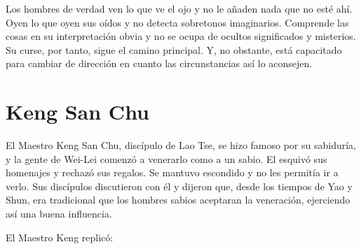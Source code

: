 \documentclass[hidelinks]{memoir}
\begin{document}
	Los hombres de verdad ven lo que ve el ojo y no le añaden nada que no
	esté ahí. Oyen lo que oyen sus oídos y no detecta sobretonos
	imaginarios. Comprende las cosas en su interpretación obvia y no se
	ocupa de ocultos significados y misterios. Su curse, por tanto, sigue el
	camino principal. Y, no obstante, está capacitado para cambiar de
	dirección en cuanto las circunstancias así lo aconsejen.
	
	\chapter*{Keng San Chu}
	
	El Maestro Keng San Chu, discípulo de Lao Tse, se hizo famoso por su
	sabiduría, y la gente de Wei-Lei comenzó a venerarlo como a un sabio. El
	esquivó sus homenajes y rechazó sus regalos. Se mantuvo escondido y no
	les permitía ir a verlo. Sus discípulos discutieron con él y dijeron
	que, desde los tiempos de Yao y Shun, era tradicional que los hombres
	sabios aceptaran la veneración, ejerciendo así una buena influencia.
	
	El Maestro Keng replicó:
	
\end{document}
